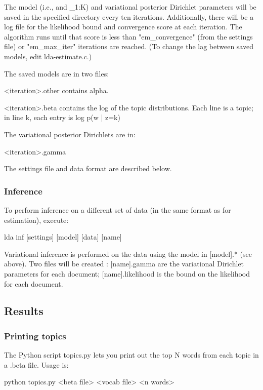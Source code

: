 The model (i.e., \alpha and \beta_{1:K}) and variational posterior
Dirichlet parameters will be saved in the specified directory every
ten iterations.  Additionally, there will be a log file for the
likelihood bound and convergence score at each iteration.  The
algorithm runs until that score is less than "em_convergence" (from
the settings file) or "em_max_iter" iterations are reached.  (To
change the lag between saved models, edit lda-estimate.c.)

The saved models are in two files:

     <iteration>.other contains alpha.

     <iteration>.beta contains the log of the topic distributions.
     Each line is a topic; in line k, each entry is log p(w | z=k)

The variational posterior Dirichlets are in:

     <iteration>.gamma

The settings file and data format are described below.


\subsubsection{Inference}

To perform inference on a different set of data (in the same format as
for estimation), execute:

     lda inf [settings] [model] [data] [name]

Variational inference is performed on the data using the model in
[model].* (see above).  Two files will be created : [name].gamma are
the variational Dirichlet parameters for each document;
[name].likelihood is the bound on the likelihood for each document.



\subsection{Results}

\subsubsection{Printing topics}

The Python script topics.py lets you print out the top N
words from each topic in a .beta file.  Usage is:

     python topics.py <beta file> <vocab file> <n words>


